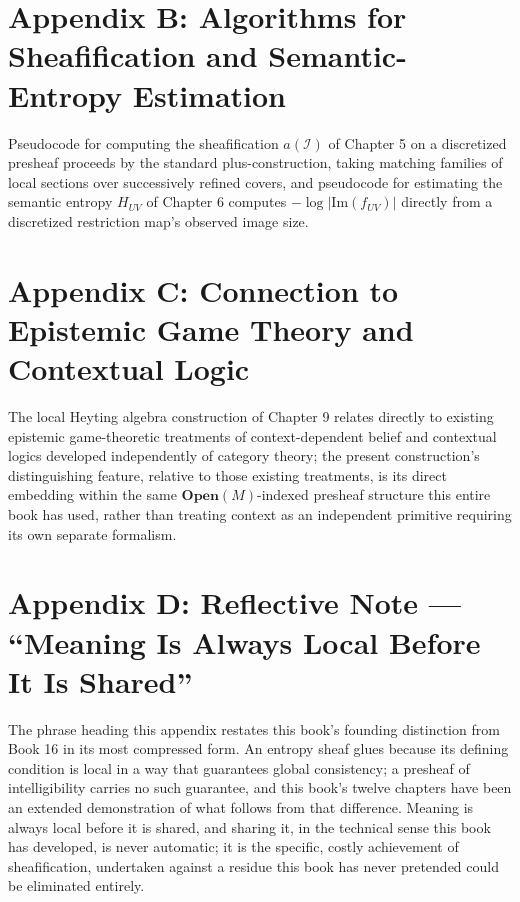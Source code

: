 \chapter*{Appendix B: Algorithms for Sheafification and Semantic-Entropy Estimation}

Pseudocode for computing the sheafification $a(\mathcal{I})$ of Chapter 5 on a discretized presheaf proceeds by the standard plus-construction, taking matching families of local sections over successively refined covers, and pseudocode for estimating the semantic entropy $H_{UV}$ of Chapter 6 computes $-\log|\mathrm{Im}(f_{UV})|$ directly from a discretized restriction map's observed image size.

\chapter*{Appendix C: Connection to Epistemic Game Theory and Contextual Logic}

The local Heyting algebra construction of Chapter 9 relates directly to existing epistemic game-theoretic treatments of context-dependent belief and contextual logics developed independently of category theory; the present construction's distinguishing feature, relative to those existing treatments, is its direct embedding within the same $\mathbf{Open}(M)$-indexed presheaf structure this entire book has used, rather than treating context as an independent primitive requiring its own separate formalism.

\chapter*{Appendix D: Reflective Note --- ``Meaning Is Always Local Before It Is Shared''}

The phrase heading this appendix restates this book's founding distinction from Book 16 in its most compressed form. An entropy sheaf glues because its defining condition is local in a way that guarantees global consistency; a presheaf of intelligibility carries no such guarantee, and this book's twelve chapters have been an extended demonstration of what follows from that difference. Meaning is always local before it is shared, and sharing it, in the technical sense this book has developed, is never automatic; it is the specific, costly achievement of sheafification, undertaken against a residue this book has never pretended could be eliminated entirely.
